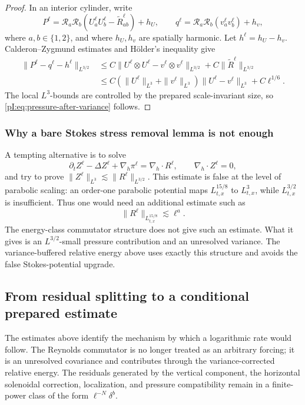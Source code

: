 \documentclass[11pt]{article}
\numberwithin{equation}{section}
\theoremstyle{plain}
\theoremstyle{definition}
\theoremstyle{remark}
\newcommand{\nabh}{\nabla_h}
\newcommand{\divh}{\nabla_h\!\cdot}
\newcommand{\calR}{\mathcal R}
\begin{document}
\begin{proof}
In an interior cylinder, write
\[
        P^\ell=\calR_a\calR_b(U_a^\ell U_b^\ell-\widetilde R_{ab}^\ell)+h_U,
        \qquad
        q^\ell=\calR_a\calR_b(v_a^\ell v_b^\ell)+h_v,
\]
where \(a,b\in\{1,2\}\), and where \(h_U,h_v\) are spatially harmonic.  Let \(h^\ell=h_U-h_v\).  Calderon--Zygmund estimates and H\"older's inequality give
\[
\begin{aligned}
        \|P^\ell-q^\ell-h^\ell\|_{L^{3/2}}
        &\le
        C\|U^\ell\otimes U^\ell-v^\ell\otimes v^\ell\|_{L^{3/2}}
        +C\|\widetilde R^\ell\|_{L^{3/2}}\\
        &\le
        C(\|U^\ell\|_{L^3}+\|v^\ell\|_{L^3})\|U^\ell-v^\ell\|_{L^3}
        +C\ell^{1/6}.
\end{aligned}
\]
The local \(L^3\)-bounds are controlled by the prepared scale-invariant size, so \eqref{pI:eq:pressure-after-variance} follows.
\end{proof}

\subsubsection{Why a bare Stokes stress removal lemma is not enough}

A tempting alternative is to solve
\[
        \partial_t Z^\ell-
        \Delta Z^\ell+
        \nabh\pi^\ell=
        \divh R^\ell,
        \qquad
        \divh Z^\ell=0,
\]
and try to prove \(\|Z^\ell\|_{L^3}\lesssim\|R^\ell\|_{L^{3/2}}\).  This estimate is false at the level of parabolic scaling: an order-one parabolic potential maps \(L^{15/8}_{t,x}\) to \(L^3_{t,x}\), while \(L^{3/2}_{t,x}\) is insufficient.  Thus one would need an additional estimate such as
\[
        \|R^\ell\|_{L^{15/8}_{t,x}}
        \lesssim \ell^a.
\]
The energy-class commutator structure does not give such an estimate.  What it gives is an \(L^{3/2}\)-small pressure contribution and an unresolved variance.  The variance-buffered relative energy above uses exactly this structure and avoids the false Stokes-potential upgrade.


\subsection{From residual splitting to a conditional prepared estimate}\label{pI:sec:prepared-estimate}

The estimates above identify the mechanism by which a logarithmic rate would follow.  The Reynolds commutator is no longer treated as an arbitrary forcing; it is an unresolved covariance and contributes through the variance-corrected relative energy.  The residuals generated by the vertical component, the horizontal solenoidal correction, localization, and pressure compatibility remain in a finite-power class of the form \(\ell^{-N}\delta^b\).
\end{document}
